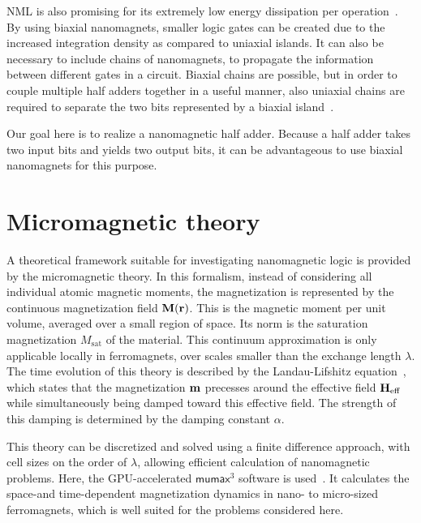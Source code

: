 \documentclass[twocolumn]{phdsymp}
\newcommand{\mumax}{$\mathsf{mumax}^3$}
\begin{document}
NML is also promising for its extremely low energy dissipation per operation~\cite{MQCA_RoomTemp,SubnanosecondPropagation_AnisotropyChains,FourStateLogic}. By using biaxial nanomagnets, smaller logic gates can be created due to the increased integration density as compared to uniaxial islands. It can also be necessary to include chains of nanomagnets, to propagate the information between different gates in a circuit. Biaxial chains are possible, but in order to couple multiple half adders together in a useful manner, also uniaxial chains are required to separate the two bits represented by a biaxial island~\cite{GYP-18,MQCA_MajorityGate,SwitchingForced_EnergyEfficient,MQCA_ImageRecognition}. \par
Our goal here is to realize a nanomagnetic half adder. Because a half adder takes two input bits and yields two output bits, it can be advantageous to use biaxial nanomagnets for this purpose.



\section{Micromagnetic theory}
A theoretical framework suitable for investigating nanomagnetic logic is provided by the micromagnetic theory. In this formalism, instead of considering all individual atomic magnetic moments, the magnetization is represented by the continuous magnetization field $\vb{M}(\vb{r})$. This is the magnetic moment per unit volume, averaged over a small region of space. Its norm is the saturation magnetization $M_{\mathrm{sat}}$ of the material. This continuum approximation is only applicable locally in ferromagnets, over scales smaller than the exchange length $\lambda$. The time evolution of this theory is described by the Landau-Lifshitz equation~\cite{lifdau}, which states that the magnetization $\vb{m}$ precesses around the effective field $\vb{H_{\mathrm{eff}}}$ while simultaneously being damped toward this effective field. The strength of this damping is determined by the damping constant $\alpha$. \par
This theory can be discretized and solved using a finite difference approach, with cell sizes on the order of $\lambda$, allowing efficient calculation of nanomagnetic problems. Here, the GPU-accelerated \mumax{} software is used~\cite{MuMax3}. It calculates the space-and time-dependent magnetization dynamics in nano- to micro-sized ferromagnets, which is well suited for the problems considered here.
\end{document}
